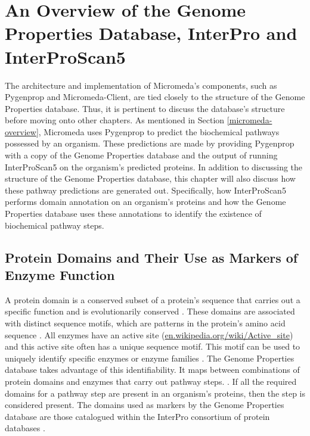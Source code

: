 \chapter{An Overview of the Genome Properties Database, InterPro and InterProScan5} \label{genome-properties} 

The architecture and implementation of Micromeda's components, such as Pygenprop and Micromeda-Client, are tied closely to the structure of the Genome Properties database. Thus, it is pertinent to discuss the database's structure before moving onto other chapters. As mentioned in Section \ref{micromeda-overview}, Micromeda uses Pygenprop to predict the biochemical pathways possessed by an organism. These predictions are made by providing Pygenprop with a copy of the Genome Properties database and the output of running InterProScan5 on the organism's predicted proteins. In addition to discussing the structure of the Genome Properties database, this chapter will also discuss how these pathway predictions are generated out. Specifically, how InterProScan5 performs domain annotation on an organism's proteins and how the Genome Properties database uses these annotations to identify the existence of biochemical pathway steps.

\section{Protein Domains and Their Use as Markers of Enzyme Function}

A protein domain is a conserved subset of a protein's sequence that carries out a specific function and is evolutionarily conserved \cite{ren2008conservation}. These domains are associated with distinct sequence motifs, which are patterns in the protein's amino acid sequence \cite{ren2008conservation}. All enzymes have an active site (\href{en.wikipedia.org/wiki/Active\_site}{en.wikipedia.org/wiki/Active\_site}) and this active site often has a unique sequence motif. This motif can be used to uniquely identify specific enzymes or enzyme families \cite{ren2008conservation}. The Genome Properties database takes advantage of this identifiability. It maps between combinations of protein domains and enzymes that carry out pathway steps. \cite{richardson2018genome}. If all the required domains for a pathway step are present in an organism's proteins, then the step is considered present. The domains used as markers by the Genome Properties database are those catalogued within the InterPro consortium of protein databases \cite{apweiler2000interpro,richardson2018genome}.


